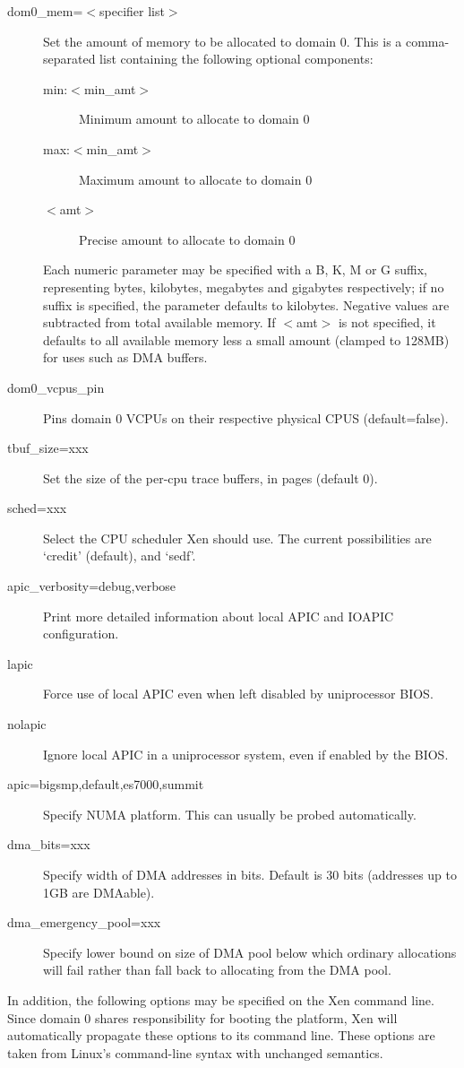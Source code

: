 \documentclass[11pt,twoside,final,openright]{report}
\begin{document}
\begin{description}
\item [ dom0\_mem=$<$specifier list$>$ ] Set the amount of memory to
  be allocated to domain 0. This is a comma-separated list containing
  the following optional components:
  \begin{description}
  \item[ min:$<$min\_amt$>$ ] Minimum amount to allocate to domain 0
  \item[ max:$<$min\_amt$>$ ] Maximum amount to allocate to domain 0
  \item[ $<$amt$>$ ] Precise amount to allocate to domain 0
  \end{description}
  Each numeric parameter may be specified with a B, K, M or
  G suffix, representing bytes, kilobytes, megabytes and gigabytes
  respectively; if no suffix is specified, the parameter defaults to
  kilobytes. Negative values are subtracted from total available
  memory. If $<$amt$>$ is not specified, it defaults to all available
  memory less a small amount (clamped to 128MB) for uses such as DMA
  buffers.
\item [ dom0\_vcpus\_pin ] Pins domain 0 VCPUs on their respective
  physical CPUS (default=false).
\item [ tbuf\_size=xxx ] Set the size of the per-cpu trace buffers, in
  pages (default 0).  
\item [ sched=xxx ] Select the CPU scheduler Xen should use.  The
  current possibilities are `credit' (default), and `sedf'.
\item [ apic\_verbosity=debug,verbose ] Print more detailed
  information about local APIC and IOAPIC configuration.
\item [ lapic ] Force use of local APIC even when left disabled by
  uniprocessor BIOS.
\item [ nolapic ] Ignore local APIC in a uniprocessor system, even if
  enabled by the BIOS.
\item [ apic=bigsmp,default,es7000,summit ] Specify NUMA platform.
  This can usually be probed automatically.
\item [ dma\_bits=xxx ] Specify width of DMA
  addresses in bits. Default is 30 bits (addresses up to 1GB are DMAable).
\item [ dma\_emergency\_pool=xxx ] Specify lower bound on size of DMA
  pool below which ordinary allocations will fail rather than fall
  back to allocating from the DMA pool.
\end{description}

In addition, the following options may be specified on the Xen command
line. Since domain 0 shares responsibility for booting the platform,
Xen will automatically propagate these options to its command line.
These options are taken from Linux's command-line syntax with
unchanged semantics.
\end{document}
